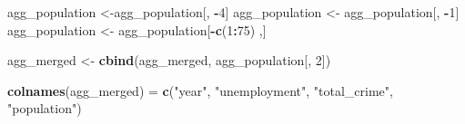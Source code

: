 \documentclass[
]{article}
\newenvironment{Shaded}{\begin{snugshade}}{\end{snugshade}}
\newcommand{\DecValTok}[1]{\textcolor[rgb]{0.00,0.00,0.81}{#1}}
\newcommand{\FunctionTok}[1]{\textcolor[rgb]{0.13,0.29,0.53}{\textbf{#1}}}
\newcommand{\NormalTok}[1]{#1}
\newcommand{\OtherTok}[1]{\textcolor[rgb]{0.56,0.35,0.01}{#1}}
\newcommand{\SpecialCharTok}[1]{\textcolor[rgb]{0.81,0.36,0.00}{\textbf{#1}}}
\newcommand{\StringTok}[1]{\textcolor[rgb]{0.31,0.60,0.02}{#1}}
\begin{document}
\begin{Shaded}
\begin{Highlighting}[]
\NormalTok{agg\_population }\OtherTok{\textless{}{-}}\NormalTok{agg\_population[, }\SpecialCharTok{{-}}\DecValTok{4}\NormalTok{]}
\NormalTok{agg\_population }\OtherTok{\textless{}{-}}\NormalTok{ agg\_population[, }\SpecialCharTok{{-}}\DecValTok{1}\NormalTok{]}
\NormalTok{agg\_population }\OtherTok{\textless{}{-}}\NormalTok{ agg\_population[}\SpecialCharTok{{-}}\FunctionTok{c}\NormalTok{(}\DecValTok{1}\SpecialCharTok{:}\DecValTok{75}\NormalTok{) ,]}

\NormalTok{agg\_merged }\OtherTok{\textless{}{-}} \FunctionTok{cbind}\NormalTok{(agg\_merged, agg\_population[, }\DecValTok{2}\NormalTok{])}

\FunctionTok{colnames}\NormalTok{(agg\_merged) }\OtherTok{=} \FunctionTok{c}\NormalTok{(}\StringTok{"year"}\NormalTok{, }\StringTok{"unemployment"}\NormalTok{, }\StringTok{"total\_crime"}\NormalTok{, }\StringTok{"population"}\NormalTok{)}
\end{Highlighting}
\end{Shaded}
\end{document}
